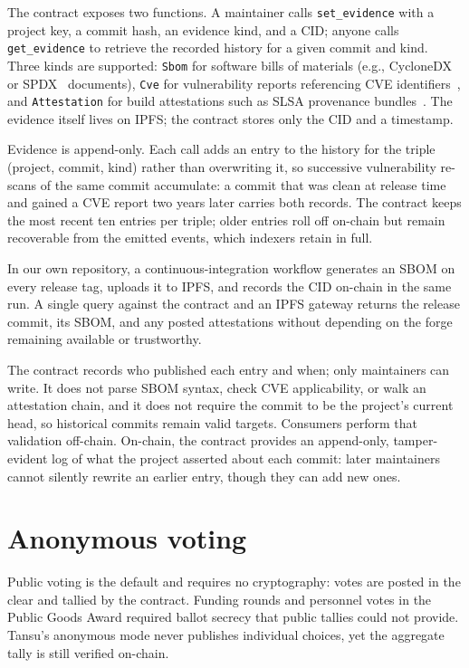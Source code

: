 \documentclass[11pt]{article}
\newcommand{\tansu}{Tansu}
\begin{document}
The contract exposes two functions. A maintainer calls \texttt{set\_evidence}
with a project key, a commit hash, an evidence kind, and a CID; anyone calls
\texttt{get\_evidence} to retrieve the recorded history for a given commit
and kind. Three kinds are supported: \texttt{Sbom} for software
bills of materials (e.g., CycloneDX~\citep{cyclonedx} or
SPDX~\citep{spdx} documents), \texttt{Cve} for vulnerability reports
referencing CVE identifiers~\citep{cveprogram}, and \texttt{Attestation} for
build attestations such as SLSA provenance bundles~\citep{slsa}. The
evidence itself lives on IPFS; the contract stores only the CID and a
timestamp.

Evidence is append-only. Each call adds an entry to the history for the
triple (project, commit, kind) rather than overwriting it, so successive
vulnerability re-scans of the same commit accumulate: a commit that was clean
at release time and gained a CVE report two years later carries both records.
The contract keeps the most recent ten entries per triple; older entries roll
off on-chain but remain recoverable from the emitted events, which indexers
retain in full.

\noindent
In our own repository, a continuous-integration workflow generates an SBOM on
every release tag, uploads it to IPFS, and records the CID on-chain in the
same run. A single query against the contract
and an IPFS gateway returns the release commit, its SBOM, and any posted
attestations without depending on the forge remaining available or trustworthy.

The contract records who published each entry and when; only maintainers can
write. It does not parse SBOM syntax, check CVE applicability, or walk an
attestation chain, and it does not require the commit to be the project's
current head, so historical commits remain valid targets. Consumers perform
that validation off-chain. On-chain, the contract provides an append-only,
tamper-evident log of what the project asserted about each commit: later
maintainers cannot silently rewrite an earlier entry, though they can add new
ones.

\section{Anonymous voting}
\label{sec:voting}

Public voting is the default and requires no cryptography: votes are posted in
the clear and tallied by the contract. Funding rounds and personnel votes in
the Public Goods Award required ballot secrecy that public tallies could not
provide. \tansu{}'s anonymous mode never publishes individual choices, yet the
aggregate tally is still verified on-chain.
\end{document}
